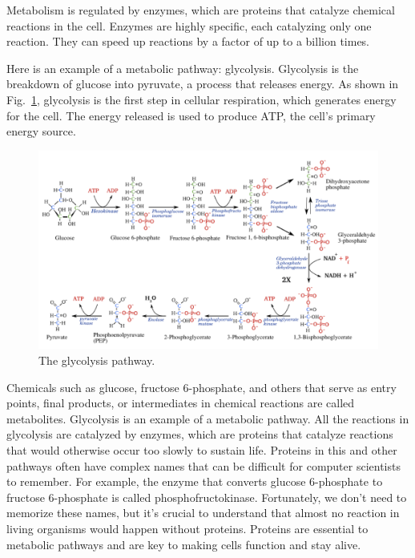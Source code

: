 Metabolism is regulated by enzymes, 
which are proteins that catalyze chemical reactions in the cell. Enzymes are highly specific, each catalyzing only one reaction. They can speed up reactions by a factor of up to a billion times.

Here is an example of a metabolic pathway: glycolysis. Glycolysis is the breakdown of glucose into pyruvate, a process that releases energy. As shown in Fig.~\ref{fig:glycolysis}, glycolysis is the first step in cellular respiration, which generates energy for the cell. The energy released is used to produce ATP, the cell's primary energy source.

\begin{figure}
    \includegraphics{figs/molbiol/glycolysis.png}
    \caption[6pt]{The glycolysis pathway.}
    \label{fig:glycolysis}
\end{figure}

Chemicals such as glucose, fructose 6-phosphate, and others that serve as entry points, final products, or intermediates in chemical reactions are called metabolites. Glycolysis is an example of a metabolic pathway. All the reactions in glycolysis are catalyzed by enzymes, which are proteins that catalyze reactions that would otherwise occur too slowly to sustain life. Proteins in this and other pathways often have complex names that can be difficult for computer scientists to remember. For example, the enzyme that converts glucose 6-phosphate to fructose 6-phosphate is called phosphofructokinase. Fortunately, we don't need to memorize these names, but it's crucial to understand that almost no reaction in living organisms would happen without proteins. Proteins are essential to metabolic pathways and are key to making cells function and stay alive.

